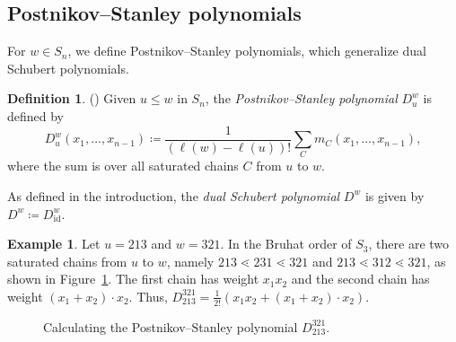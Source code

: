\documentclass[11pt]{article}
\theoremstyle{definition}
\newtheorem{defi}[theo]{Definition}
\newtheorem{exam}[theo]{Example}
\numberwithin{equation}{section}
\newcommand{\colorA}{Orchid}
\newcommand{\colorB}{Tan}
\newcommand{\id}{\mathrm{id}}
\begin{document}
\subsection{Postnikov--Stanley polynomials}
For $w \in S_n$, we define Postnikov--Stanley polynomials, which generalize dual Schubert polynomials. 
\begin{defi}(\cite{PostnikovStanley})
    Given $u\le w $ in $ S_n$, the \emph{Postnikov--Stanley polynomial} $D_u^w$ is defined by
    \[D_u^w(x_1, \dots, x_{n-1}) \coloneqq \frac{1}{(\ell(w) - \ell(u))!}\sum_{C} m_C(x_1, \dots, x_{n-1}),\]
    where the sum is over all saturated chains $C$ from $u$ to $w$.
\end{defi}
As defined in the introduction, the \emph{dual Schubert polynomial} $D^w$ is given by $D^w\coloneq D_{\id}^w$.
\begin{exam}\label{ex:PS}
    Let $u = 213$ and $w = 321$. In the Bruhat order of $S_3$, there are two saturated chains from $u$ to $w$, namely $213\lessdot 231\lessdot 321$ and $213\lessdot 312\lessdot 321$, as shown in Figure~\ref{fig:123to321}. The first chain has weight $x_1x_2$ and the second chain has weight $(x_1 + x_2) \cdot x_2$. Thus, $D_{213}^{321} = \frac{1}{2!}(x_1 x_2 + (x_1 + x_2)\cdot x_2)$. 
\end{exam}

\begin{figure}
    \centering
    \caption{Calculating the Postnikov--Stanley polynomial $D_{213}^{321}$.}
    \label{fig:123to321}
\end{figure}
\end{document}
